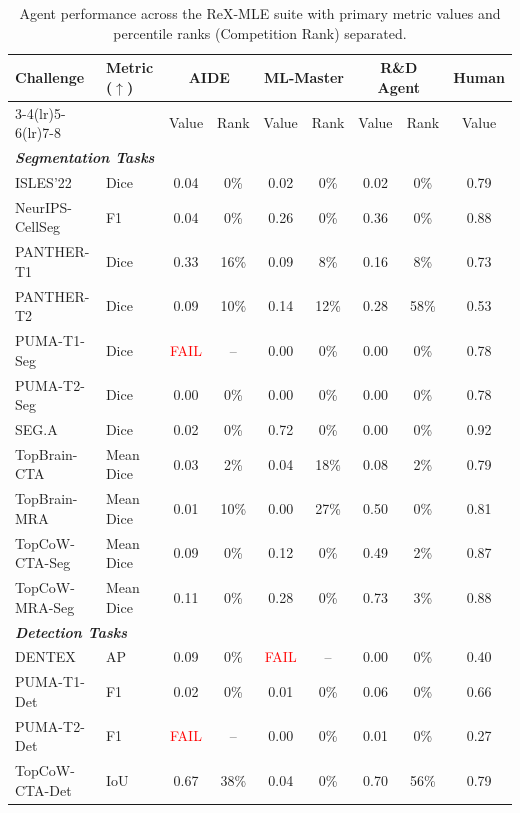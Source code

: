 \documentclass{midl} %
\begin{document}
\begin{table}[t]
\centering
\footnotesize	
\caption{Agent performance across the ReX-MLE suite with primary metric values and percentile ranks (Competition Rank) separated.}
\label{tab:agent_performance_full_split}
\begin{tabular}{l l 
                c c 
                c c 
                c c 
                c}
\toprule
\textbf{Challenge} & \textbf{Metric ($\uparrow$)} 
& \multicolumn{2}{c}{\textbf{AIDE}} 
& \multicolumn{2}{c}{\textbf{ML-Master}} 
& \multicolumn{2}{c}{\textbf{R\&D Agent}} 
& \textbf{Human} \\
\cmidrule(lr){3-4}\cmidrule(lr){5-6}\cmidrule(lr){7-8}
& & Value & Rank & Value & Rank & Value & Rank & Value \\
\midrule
\multicolumn{9}{l}{\textit{\textbf{Segmentation Tasks}}} \\
ISLES'22 & Dice & 0.04 & 0\% & 0.02 & 0\%  & 0.02 & 0\% & 0.79 \\
NeurIPS-CellSeg & F1 & 0.04 & 0\% & 0.26 & 0\% & 0.36 & 0\% & 0.88 \\
PANTHER-T1 & Dice & 0.33 & 16\% & 0.09 & 8\% & 0.16 & 8\% & 0.73 \\
PANTHER-T2 & Dice & 0.09 & 10\% & 0.14 & 12\% & 0.28 & 58\% & 0.53 \\
PUMA-T1-Seg & Dice & \textcolor{red}{FAIL} & -- & 0.00 & 0\% & 0.00 & 0\% & 0.78 \\
PUMA-T2-Seg & Dice & 0.00 & 0\% & 0.00 & 0\% & 0.00 & 0\% & 0.78 \\
SEG.A & Dice & 0.02 & 0\% & 0.72 & 0\% & 0.00 & 0\% & 0.92 \\
TopBrain-CTA & Mean Dice & 0.03 & 2\% & 0.04 & 18\% & 0.08 & 2\% & 0.79 \\
TopBrain-MRA & Mean Dice & 0.01 & 10\% & 0.00 & 27\% & 0.50 & 0\% & 0.81 \\
TopCoW-CTA-Seg & Mean Dice & 0.09 & 0\% & 0.12 & 0\% & 0.49 & 2\% & 0.87 \\
TopCoW-MRA-Seg & Mean Dice & 0.11 & 0\% & 0.28 & 0\% & 0.73 & 3\% & 0.88 \\
\midrule
\multicolumn{9}{l}{\textit{\textbf{Detection Tasks}}} \\
DENTEX & AP & 0.09 & 0\% & \textcolor{red}{FAIL} & -- & 0.00 & 0\% & 0.40 \\
PUMA-T1-Det & F1 & 0.02 & 0\% & 0.01 & 0\% & 0.06 & 0\% & 0.66 \\
PUMA-T2-Det & F1 & \textcolor{red}{FAIL} & -- & 0.00 & 0\% & 0.01 & 0\% & 0.27 \\
TopCoW-CTA-Det & IoU & 0.67 & 38\% & 0.04 & 0\% & 0.70 & 56\% & 0.79 \\

\end{tabular}
\end{table}
\end{document}
